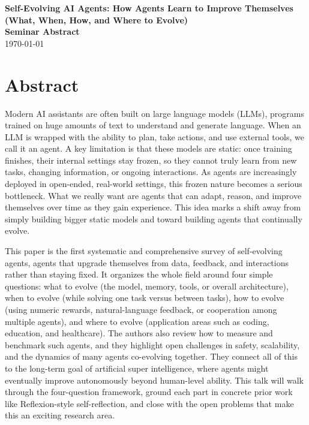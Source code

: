 \documentclass[12pt]{article}
\newcommand{\seminardate}{\today}
\begin{document}
\begin{center}
  {\LARGE\bfseries Self-Evolving AI Agents: How Agents Learn to Improve Themselves (What, When, How, and Where to Evolve)}\\[8pt]
  {\large\bfseries Seminar Abstract}\\[6pt]
  {\normalsize \seminardate}
\end{center}
\vspace{1.5em}

\section*{Abstract}
Modern AI assistants are often built on large language models (LLMs), programs trained on huge amounts of text to understand and generate language. When an LLM is wrapped with the ability to plan, take actions, and use external tools, we call it an agent. A key limitation is that these models are static: once training finishes, their internal settings stay frozen, so they cannot truly learn from new tasks, changing information, or ongoing interactions. As agents are increasingly deployed in open-ended, real-world settings, this frozen nature becomes a serious bottleneck. What we really want are agents that can adapt, reason, and improve themselves over time as they gain experience. This idea marks a shift away from simply building bigger static models and toward building agents that continually evolve.

This paper is the first systematic and comprehensive survey of self-evolving agents, agents that upgrade themselves from data, feedback, and interactions rather than staying fixed. It organizes the whole field around four simple questions: what to evolve (the model, memory, tools, or overall architecture), when to evolve (while solving one task versus between tasks), how to evolve (using numeric rewards, natural-language feedback, or cooperation among multiple agents), and where to evolve (application areas such as coding, education, and healthcare). The authors also review how to measure and benchmark such agents, and they highlight open challenges in safety, scalability, and the dynamics of many agents co-evolving together. They connect all of this to the long-term goal of artificial super intelligence, where agents might eventually improve autonomously beyond human-level ability. This talk will walk through the four-question framework, ground each part in concrete prior work like Reflexion-style self-reflection, and close with the open problems that make this an exciting research area.
\end{document}
